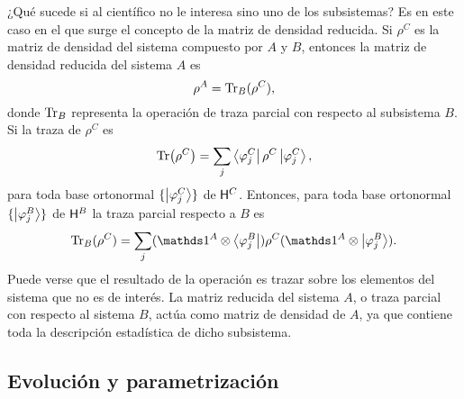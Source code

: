 ¿Qué sucede si al científico no le interesa sino uno de los subsistemas? Es en este caso en el que surge el concepto de la matriz de densidad reducida. Si $\rho^{C}$ es la matriz de densidad del sistema compuesto por $A$ y $B$, entonces la matriz de densidad reducida del sistema $A$ es
\begin{equation*}
    \rho^{A}=\Tr_{B}(\rho^{C}),
\end{equation*}
donde $\Tr_{B}$ representa la operación de traza parcial con respecto al subsistema $B$. Si la traza de $\rho^{C}$ es 
\begin{equation*}
    \Tr(\rho^{C})=\sum_{j}\bra{\varphi^{C}_{j}}\rho^{C}\ket{\varphi^{C}_{j}},
\end{equation*}
para toda base ortonormal $\{\ket{\varphi^{C}_{j}}\}$ de ${\sf H}^{C}$. Entonces, para toda base ortonormal $\{\ket{\varphi^{B}_{j}}\}$ de ${\sf H}^{B}$  la traza parcial respecto a $B$ es \cite{Hardy}
\begin{equation*}
    \Tr_{B}(\rho^{C})=\sum_{j}(\Id^{A}\otimes \bra{\varphi^{B}_{j}})\rho^{C}(\Id^{A}\otimes \ket{\varphi^{B}_{j}}).
\end{equation*}
Puede verse que el resultado de la operación es trazar sobre los elementos del sistema que no es de interés. La matriz reducida del sistema $A$, o traza parcial con respecto al sistema $B$, actúa como matriz de densidad de $A$, ya que contiene toda la descripción estadística de dicho subsistema.

\subsection{Evolución y parametrización}

